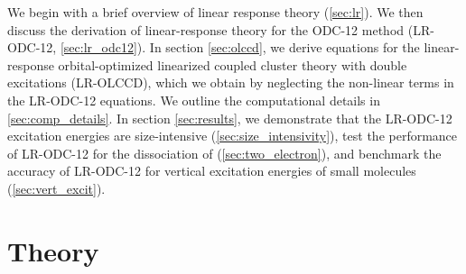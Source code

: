 We begin with a brief overview of linear response theory (\cref{sec:lr}).
We then discuss the derivation of linear-response theory for the ODC-12 method
(LR-ODC-12, \cref{sec:lr_odc12}).
In section \cref{sec:olccd}, 
we derive equations for the linear-response orbital-optimized linearized
coupled cluster theory with double excitations (LR-OLCCD), which we obtain by
neglecting the non-linear terms in the LR-ODC-12 equations. 
We outline the
computational details in \cref{sec:comp_details}.
In section \cref{sec:results}, we demonstrate that the LR-ODC-12 excitation
energies are size-intensive (\cref{sec:size_intensivity}), test the performance
of LR-ODC-12 for the dissociation of  (\cref{sec:two_electron}), and
benchmark the accuracy of LR-ODC-12 for vertical
excitation energies of small molecules (\cref{sec:vert_excit}).


\section{Theory}

